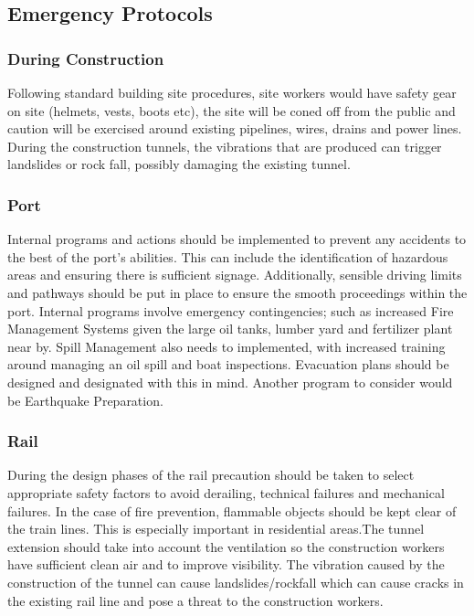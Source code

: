 \begin{multicols}{2}
\subsection*{Emergency Protocols}
    \subsubsection*{During Construction}
        Following standard building site procedures, site workers would have safety gear on site (helmets, vests, boots etc), the site will be coned off from the public and caution will be exercised around existing pipelines, wires, drains and power lines. During the construction tunnels, the vibrations that are produced can trigger landslides or rock fall, possibly damaging the existing tunnel.
    \subsubsection*{Port}
        Internal programs and actions should be implemented to prevent any accidents to the best of the port’s abilities. This can include the identification of hazardous areas and ensuring there is sufficient signage. Additionally, sensible driving limits and pathways should be put in place to ensure the smooth proceedings within the port. Internal programs involve emergency contingencies; such as increased Fire Management Systems given the large oil tanks, lumber yard and fertilizer plant near by. Spill Management also needs to implemented, with increased training around managing an oil spill and boat inspections. Evacuation plans should be designed and designated with this in mind. Another program to consider would be Earthquake Preparation.
    \subsubsection*{Rail}
        During the design phases of the rail precaution should be taken to select appropriate safety factors to avoid derailing, technical failures and mechanical failures. In the case of fire prevention, flammable objects should be kept clear of the train lines. This is especially important in residential areas.The tunnel extension should take into account the ventilation so the construction workers have sufficient clean air and to improve visibility. The vibration caused by the construction of the tunnel can cause landslides/rockfall which can cause cracks in the existing rail line and pose a threat to the construction workers.

\end{multicols}

